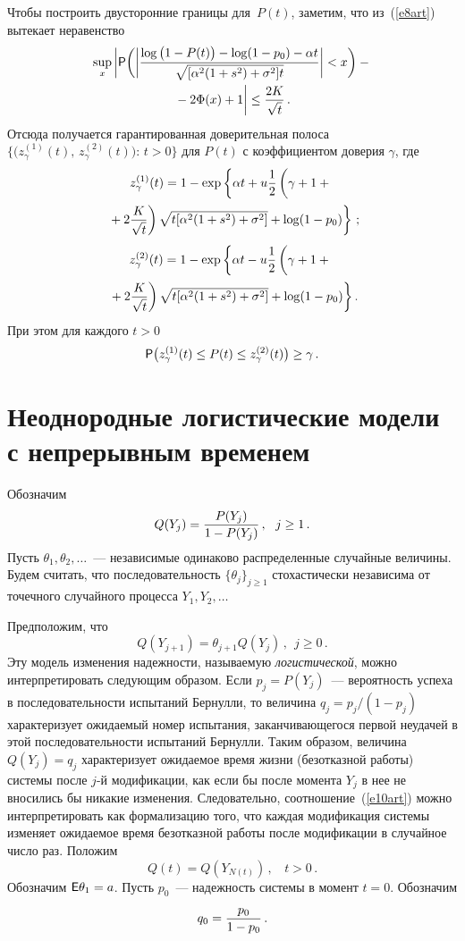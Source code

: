 \begin{multicols}{2}
Чтобы построить двусторонние границы для~$P(t)$, заметим, что из~(\ref{e8art})
вытекает неравенство
\begin{multline*}
\sup_x\bigg|{\sf P}\bigg(\bigg|\displaystyle\frac{\displaystyle \log \big(1-P(t)\big)-\log
(1-p_0)-\alpha
t\mathstrut}{\displaystyle \sqrt{[\alpha^2(1+s^2)+\sigma^2]t}\mathstrut}\bigg|<x\bigg)-{}\\
{}-2\Phi(x)+1\bigg|\le
\displaystyle\frac{\displaystyle 2K\mathstrut}{\displaystyle \sqrt{t}\mathstrut}\,.
\end{multline*}
Отсюда получается гарантированная доверительная полоса
$\big\{\big(z^{(1)}_{\gamma}(t),\,z^{(2)}_{\gamma}(t)\big):\,t>0\big\}$
для $P(t)$ с коэффициентом доверия $\gamma$, где
\begin{multline*}
z^{(1)}_{\gamma}(t)=1-\exp\left\{\alpha
t+u %
\fr{1}{2}\left( \vphantom{\fr{K}{\sqrt{t}}}
\gamma+1+{}\right. \right.
\\
\left. \left.
{} +2\fr{K}{\sqrt{t}}\right )%
\sqrt{t[\alpha^2(1+s^2)+
\sigma^2]}+\log(1-p_0)\right\}\,;
\end{multline*}
\begin{multline*}
z^{(2)}_{\gamma}(t)=1-\exp\left\{\alpha
t-u %
\fr{1}{2}\left( \vphantom{\fr{K}{\sqrt{t}}}
\gamma+1+{}\right. \right.
\\
\left. \left.
{}+2\fr{K}{\sqrt{t}}\right) %
\sqrt{t[\alpha^2(1+s^2)+
\sigma^2]}+\log(1-p_0)\right\}.
\end{multline*}
При этом для каждого $t>0$
$$
{\sf P}\big(z^{(1)}_{\gamma}(t)\le P(t)\le
z^{(2)}_{\gamma}(t)\big)\ge\gamma\,.
$$

\section{Неоднородные логистические модели с непрерывным временем}

Обозначим
$$
Q(Y_j)=\displaystyle\frac{\displaystyle P(Y_j)\mathstrut}{\displaystyle 1-P(Y_j)\mathstrut}\,,\ \ j\ge1\,.
$$
Пусть $\theta_1,\theta_2,\ldots$~--- независимые одинаково
распределенные случайные величины. Будем считать, что
последовательность $\{\theta_j\}_{j\ge1}$ стохастически независима
от точечного случайного процесса $Y_1,Y_2,\ldots$

Предположим, что
\begin{equation}
Q(Y_{j+1})=\theta_{j+1}Q(Y_j)\,,\ \ j\ge0\,.
\label{e10art}
\end{equation}
Эту модель изменения надежности, называемую {\it логистической},
можно интерпретировать следующим образом. Если $p_j=P(Y_j)$~---
вероятность успеха в последовательности испытаний Бернулли, то
величина $q_j=p_j/(1-p_j)$ характеризует ожидаемый номер
испытания, заканчивающегося первой неудачей в этой
последовательности испытаний Бернулли. Таким образом, величина
$Q(Y_j)=q_j$ характеризует ожида\-емое время жизни (безотказной
работы) системы после $j$-й модификации, как если бы после момента
$Y_j$ в нее не вносились бы никакие изменения. Следовательно,
соотношение~(\ref{e10art}) можно интерпретировать как формализацию того, что
каждая модификация системы изменяет ожи\-да\-емое время безотказной
работы после модификации в случайное число раз. Положим
$$
Q(t)=Q(Y_{N(t)})\,,\ \ \ \ t>0\,.
$$
Обозначим ${\sf E}\theta_1=a$. Пусть $p_0$~--- надежность системы в
момент $t=0$. Обозначим
$$
q_0=\displaystyle\frac{\displaystyle p_0\mathstrut}{\displaystyle 1-p_0\mathstrut}\,.
$$



\end{multicols}
